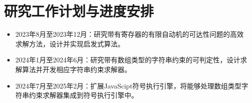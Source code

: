 \section{研究工作计划与进度安排}
\begin{itemize}
    \item 2023年8月至2023年12月：研究带有寄存器的有限自动机的可达性问题的高效求解方法，设计并实现启发式算法。
    \item 2024年1月至2024年6月：研究带有数组类型的字符串约束的可判定性，设计求解算法并开发相应字符串约束求解器。  
    \item 2024年7月至2025年2月：扩展JavaScipt符号执行引擎，将能够处理数组类型字符串约束求解器集成到符号执行引擎中。
\end{itemize}


\nocite{*}%
